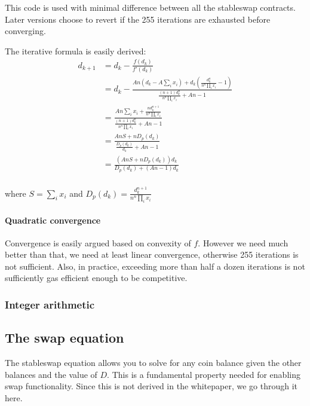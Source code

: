 \documentclass[
]{article}
\begin{document}
This code is used with minimal difference between all the stableswap
contracts. Later versions choose to revert if the 255 iterations are
exhausted before converging.

The iterative formula is easily derived: \[\begin{aligned}
d_{k+1} &= d_k - \frac{f(d_k)}{f'(d_k)} \\
&= d_k - \frac{A n (d_k - A \sum_i x_i)  + d_k(\frac{d_k^{n}}{n^n \prod_i x_i} - 1)}{\frac{(n+1)d_k^n}{n^n \prod_i x_i} + An - 1} \\
&= \frac{An\sum_i x_i + \frac{nd_k^{n+1}}{n^n \prod_i x_i}}{\frac{(n+1)d_k^n}{n^n\prod_i x_i} + An - 1} \\
&= \frac{AnS + nD_p(d_k)}{\frac{D_p(d_k)}{d_k} + An - 1} \\
&= \frac{(AnS + nD_p(d_k))d_k}{D_p(d_k) + (An-1)d_k}\\
\end{aligned}\]

where \(S = \sum_i x_i\) and
\(D_p(d_k) = \frac{d_k^{n+1}}{n^n \prod_i x_i}\)

\hypertarget{quadratic-convergence}{%
\paragraph{Quadratic convergence}\label{quadratic-convergence}}

Convergence is easily argued based on convexity of \(f\). However we
need much better than that, we need at least linear convergence,
otherwise 255 iterations is not sufficient. Also, in practice, exceeding
more than half a dozen iterations is not sufficiently gas efficient
enough to be competitive.

\hypertarget{integer-arithmetic}{%
\subsubsection{Integer arithmetic}\label{integer-arithmetic}}

\hypertarget{the-swap-equation}{%
\subsection{The swap equation}\label{the-swap-equation}}

The stableswap equation allows you to solve for any coin balance given
the other balances and the value of \(D\). This is a fundamental
property needed for enabling swap functionality. Since this is not
derived in the whitepaper, we go through it here.
\end{document}
